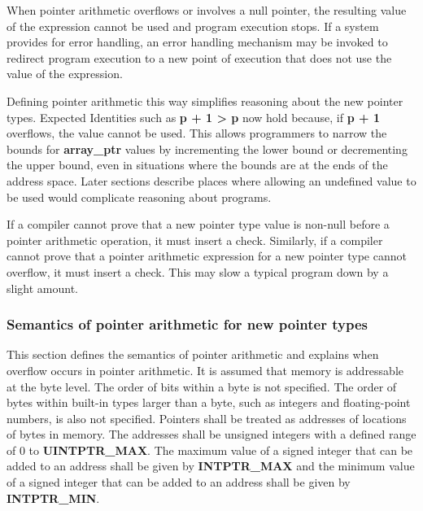 \documentclass[]{article}
\begin{document}
When pointer arithmetic overflows or involves a null pointer, the
resulting value of the expression cannot be used and program execution
stops. If a system provides for error handling, an error handling
mechanism may be invoked to redirect program execution to a new point of
execution that does not use the value of the expression.

Defining pointer arithmetic this way simplifies reasoning about the new
pointer types. Expected Identities such as \textbf{p + 1 \textgreater{}
p} now hold because, if \textbf{p + 1} overflows, the value cannot be
used. This allows programmers to narrow the bounds for
\textbf{array\_ptr} values by incrementing the lower bound or
decrementing the upper bound, even in situations where the bounds are at
the ends of the address space. Later sections describe places where
allowing an undefined value to be used would complicate reasoning about
programs.

If a compiler cannot prove that a new pointer type value is non-null
before a pointer arithmetic operation, it must insert a check.
Similarly, if a compiler cannot prove that a pointer arithmetic
expression for a new pointer type cannot overflow, it must insert a
check. This may slow a typical program down by a slight amount.

\subsubsection{\texorpdfstring{\protect\hypertarget{ux5fRef438902064}{}{\protect\hypertarget{ux5fToc440445418}{}{\protect\hypertarget{ux5fToc440449200}{}{\protect\hypertarget{ux5fToc440551850}{}{}}}}Semantics
of pointer arithmetic for new pointer
types}{Semantics of pointer arithmetic for new pointer types}}\label{semantics-of-pointer-arithmetic-for-new-pointer-types}

This section defines the semantics of pointer arithmetic and explains
when overflow occurs in pointer arithmetic. It is assumed that memory is
addressable at the byte level. The order of bits within a byte is not
specified. The order of bytes within built-in types larger than a byte,
such as integers and floating-point numbers, is also not specified.
Pointers shall be treated as addresses of locations of bytes in memory.
The addresses shall be unsigned integers with a defined range of 0 to
\textbf{UINTPTR\_MAX}. The maximum value of a signed integer that can be
added to an address shall be given by \textbf{INTPTR\_MAX} and the
minimum value of a signed integer that can be added to an address shall
be given by \textbf{INTPTR\_MIN}.
\end{document}
